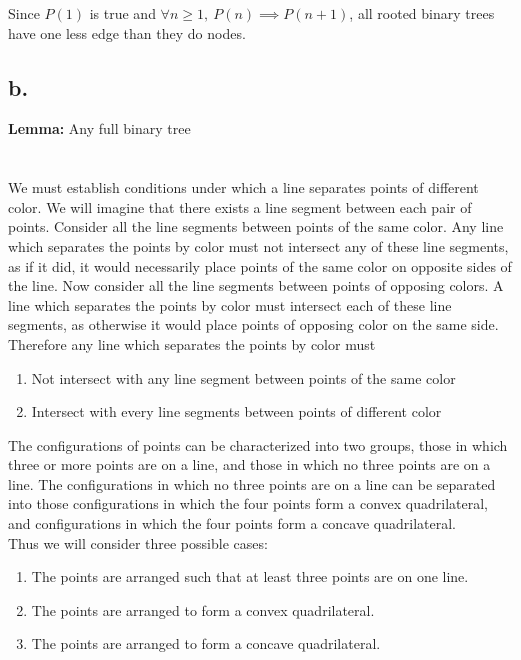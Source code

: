 \documentclass[11pt]{article}
\begin{document}
Since $P(1)$ is true and $\forall n \geq 1,\  P(n) \implies P(n+1)$, all rooted binary trees have one less edge than they do nodes.

\subsection*{b.}
\textbf{Lemma: } Any full binary tree 


\section{}
We must establish conditions under which a line separates points of different color. We will imagine that there exists a line segment between each pair of points. 
Consider all the line segments between points of the same color. Any line which separates the points by color must not intersect any of these line segments, as if it did, it would necessarily place points of the same color on opposite sides of the line. Now consider all the line segments between points of opposing colors. A line which separates the points by color must intersect each of these line segments, as otherwise it would place points of opposing color on the same side. Therefore any line which separates the points by color must
\begin{enumerate}
    \item Not intersect with any line segment between points of the same color
    \item Intersect with every line segments between points of different color
\end{enumerate}

The configurations of points can be characterized into two groups, those in which three or more points are on a line, and those in which no three points are on a line.
The configurations in which no three points are on a line can be separated into those configurations in which the four points form a convex quadrilateral, and configurations in which the four points form a concave quadrilateral. \\ 
Thus we will consider three possible cases: 
\begin{enumerate}
    \item The points are arranged such that at least three points are on one line. 
    \item The points are arranged to form a convex quadrilateral. 
    \item The points are arranged to form a concave quadrilateral.  
\end{enumerate}
\end{document}
